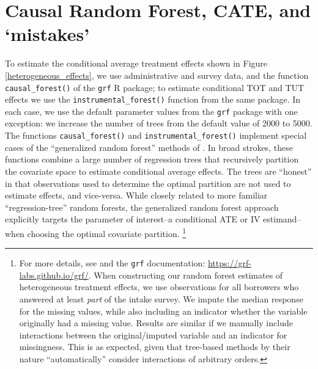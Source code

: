 \begin{appendix}
\begin{figure}[!h]
\label{te_rankinvariance}
\end{figure}


\newpage 

\section{ Causal Random Forest, CATE, and `mistakes'}\label{app:cate}


To estimate the conditional average treatment effects shown in Figure \ref{heterogeneous_effects}, we use administrative and survey data, and the function \texttt{causal\_forest()} of the \texttt{grf} R package; to estimate conditional TOT and TUT effects we use the \texttt{instrumental\_forest()} function from the same package.
In each case, we use the default parameter values from the \texttt{grf} package with one exception: we increase the number of trees from the default value of 2000 to 5000.
The functions \texttt{causal\_forest()} and \texttt{instrumental\_forest()} implement special cases of the ``generalized random forest'' methods of \cite{atheygrf}.
In broad strokes, these functions combine a large number of regression trees that recursively partition the covariate space to estimate conditional average effects.
The trees are ``honest'' in that observations used to determine the optimal partition are not used to estimate effects, and vice-versa.
While closely related to more familiar ``regression-tree'' random forests, the generalized random forest approach explicitly targets the parameter of interest--a conditional ATE or IV estimand--when choosing the optimal covariate partition.
\footnote{For more details, see \cite{atheygrf} and the \texttt{grf} documentation: \url{https://grf-labs.github.io/grf/}. When constructing our random forest estimates of heterogeneous treatment effects, we use observations for all borrowers who answered at least \emph{part} of the intake survey.
We impute the median response for the missing values, while also including an indicator whether the variable originally had a missing value. Results are similar if we manually include interactions between the original/imputed variable and an indicator for missingness. This is as expected, given that tree-based methods by their nature ``automatically'' consider interactions of arbitrary orders.}





\end{appendix}

